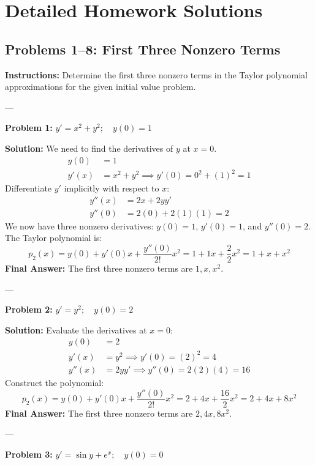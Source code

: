 \documentclass[11pt, letterpaper]{article}
\theoremstyle{definition}
\theoremstyle{remark}
\begin{document}
\newpage
\section{Detailed Homework Solutions}

\subsection{Problems 1--8: First Three Nonzero Terms}
\textbf{Instructions:} Determine the first three nonzero terms in the Taylor polynomial approximations for the given initial value problem.

---

\textbf{Problem 1:} $y' = x^2 + y^2 ; \quad y(0) = 1$

\textbf{Solution:}
We need to find the derivatives of $y$ at $x=0$.
\begin{align*}
    y(0) &= 1 \\
    y'(x) &= x^2 + y^2 \implies y'(0) = 0^2 + (1)^2 = 1
\end{align*}
Differentiate $y'$ implicitly with respect to $x$:
\begin{align*}
    y''(x) &= 2x + 2yy' \\
    y''(0) &= 2(0) + 2(1)(1) = 2
\end{align*}
We now have three nonzero derivatives: $y(0)=1$, $y'(0)=1$, and $y''(0)=2$. The Taylor polynomial is:
\[ p_2(x) = y(0) + y'(0)x + \frac{y''(0)}{2!}x^2 = 1 + 1x + \frac{2}{2}x^2 = 1 + x + x^2 \]
\textbf{Final Answer:} The first three nonzero terms are $1, x, x^2$.

---

\textbf{Problem 2:} $y' = y^2 ; \quad y(0) = 2$

\textbf{Solution:}
Evaluate the derivatives at $x=0$:
\begin{align*}
    y(0) &= 2 \\
    y'(x) &= y^2 \implies y'(0) = (2)^2 = 4 \\
    y''(x) &= 2yy' \implies y''(0) = 2(2)(4) = 16
\end{align*}
Construct the polynomial:
\[ p_2(x) = y(0) + y'(0)x + \frac{y''(0)}{2!}x^2 = 2 + 4x + \frac{16}{2}x^2 = 2 + 4x + 8x^2 \]
\textbf{Final Answer:} The first three nonzero terms are $2, 4x, 8x^2$.

---

\textbf{Problem 3:} $y' = \sin y + e^x ; \quad y(0) = 0$
\end{document}
